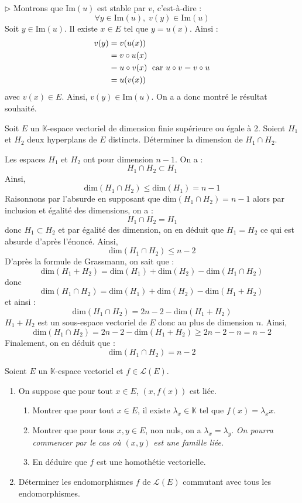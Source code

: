 \documentclass[a4paper,10pt]{report}
\begin{document}
\medskip

\noindent $\rhd$ Montrons que $\textrm{Im}(u)$ est stable par $v$, c'est-à-dire :
$$ \forall y \in \textrm{Im}(u), \; v(y) \in \textrm{Im}(u)$$
Soit $y \in \textrm{Im}(u)$. Il existe $x \in E$ tel que $y = u(x)$. Ainsi :
\begin{align*}
v(y) & = v (u(x)) \\
& = v \circ u(x) \\
& = u \circ v(x) \; \hbox{ car } u \circ v = v \circ u \\
& = u (v(x)) 
\end{align*}
avec $v(x) \in E$. Ainsi, $v(y) \in \textrm{Im}(u)$. On a a donc montré le résultat souhaité.


\begin{Exa} Soit $E$ un $\mathbb{K}$-espace vectoriel de dimension finie supérieure ou égale à 2. Soient $H_1$ et $H_2$ deux hyperplans de $E$ distincts. Déterminer la dimension de $H_1 \cap H_2$.
\end{Exa}

\corr Les espaces $H_1$ et $H_2$ ont pour dimension $n-1$. On a :
$$ H_1 \cap H_2 \subset H_1$$
Ainsi, 
$$ \textrm{dim}(H_1 \cap H_2) \leq  \textrm{dim}(H_1) = n-1$$
Raisonnons par l'absurde en supposant que $\textrm{dim}(H_1 \cap H_2) = n-1$ alors par inclusion et égalité des dimensions, on a :
$$ H_1 \cap H_2 = H_1$$
donc $H_1 \subset H_2$ et par égalité des dimension, on en déduit que $H_1 = H_2$ ce qui est absurde d'après l'énoncé. Ainsi,
$$  \textrm{dim}(H_1 \cap H_2) \leq n-2$$
D'après la formule de Grassmann, on sait que :
$$  \textrm{dim}(H_1 + H_2) =  \textrm{dim}(H_1)  +  \textrm{dim}(H_2) -  \textrm{dim}(H_1 \cap H_2) $$
donc 
$$  \textrm{dim}(H_1 \cap H_2) =  \textrm{dim}(H_1)  +  \textrm{dim}(H_2) -  \textrm{dim}(H_1 + H_2) $$
et ainsi :
$$\textrm{dim}(H_1 \cap H_2) =  2n-2 -  \textrm{dim}(H_1 + H_2) $$
$H_1+H_2$ est un sous-espace vectoriel de $E$ donc au plus de dimension $n$. Ainsi,
$$\textrm{dim}(H_1 \cap H_2) =  2n-2 -  \textrm{dim}(H_1 + H_2) \geq 2n-2-n = n-2$$
Finalement, on en déduit que :
$$ \textrm{dim}(H_1 \cap H_2) =  n-2 $$


\begin{Exa} Soient $E$ un $\mathbb{K}$-espace vectoriel et $f \in \mathcal{L}(E)$.

\begin{enumerate}
\item On suppose que pour tout $x \in E$, $(x, f(x))$ est liée.
\begin{enumerate}
\item Montrer que pour tout $x \in E$, il existe $\lambda_x \in \mathbb{K}$ tel que $f(x)= \lambda_x x$.
\item Montrer que pour tous $x,y \in E$, non nuls, on a $\lambda_x = \lambda_y$. \textit{On pourra commencer par le cas où $(x,y)$ est une famille liée.}
\item En déduire que $f$ est une homothétie vectorielle.
\end{enumerate}
\item Déterminer les endomorphismes $f$ de $\mathcal{L}(E)$ commutant avec tous les endomorphismes.
\end{enumerate}
\end{Exa} 
\end{document}
